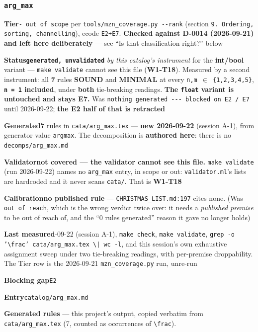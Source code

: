 \documentclass[10pt,a4paper]{article}
\newcommand{\entryfield}[2]{{\raggedright\textbf{#1}\quad #2\par}}
\begin{document}
\subsubsection*{\texttt{arg\_\allowbreak{}max}}
\label{entry:arg-max}
\entryfield{Tier}{\texttt{- out of scope} per \texttt{tools/\allowbreak{}mzn\_\allowbreak{}coverage.\allowbreak{}py -\allowbreak{}-\allowbreak{}rank} (section \texttt{9.\allowbreak{} Ordering, sorting, channelling}), ecode \texttt{E2+E7}. \textbf{Checked against D-0014 (2026-09-21) and left here deliberately} --- see ``Is that classification right?'' below}
\entryfield{Status}{\textbf{\texttt{generated, unvalidated}} \emph{by this catalog's instrument} for the \textbf{int/bool} variant --- \texttt{make validate} cannot see this file (\textbf{W1-T18}). Measured by a second instrument: all \textbf{7} rules \textbf{SOUND} and \textbf{MINIMAL} at every \texttt{n,m $\in$ \{1,2,3,4,5\}}, \textbf{\texttt{n = 1} included}, under \textbf{both} tie-breaking readings. \textbf{The \texttt{float} variant is untouched and stays E7.} Was \texttt{nothing generated -\allowbreak{}-\allowbreak{}-\allowbreak{} blocked on E2 /\allowbreak{} E7} until 2026-09-22; \textbf{the E2 half of that is retracted}}
\entryfield{Generated}{\textbf{7} rules in \texttt{cata/arg\_max.tex} --- \textbf{new 2026-09-22} (session A-1), from generator value \texttt{argmax}. The decomposition is \textbf{authored here}: there is no \texttt{decomps/arg\_max.md}}
\entryfield{Validator}{\textbf{not covered --- the validator cannot see this file.} \texttt{make validate} (run 2026-09-22) names no \texttt{arg\_max} entry, in scope or out: \texttt{validator.ml}'s lists are hardcoded and it never scans \texttt{cata/}. That is \textbf{W1-T18}}
\entryfield{Calibration}{\textbf{no published rule} --- \texttt{CHRISTMAS\_LIST.md:197} cites none. (Was \texttt{out of reach}, which is the wrong verdict twice over: it needs a \emph{published premise} to be out of reach of, and the ``0 rules generated'' reason it gave no longer holds)}
\entryfield{Last measured}{2026-09-22 (session A-1), \texttt{make check}, \texttt{make validate}, \texttt{grep -\allowbreak{}o '\textbackslash{}frac' cata/\allowbreak{}arg\_\allowbreak{}max.\allowbreak{}tex \textbackslash{}| wc -\allowbreak{}l}, and this session's own exhaustive assignment sweep under two tie-breaking readings, with per-premise droppability. The Tier row is the 2026-09-21 \texttt{mzn\_coverage.py} run, unre-run}
\entryfield{Blocking gap}{\texttt{E2}}
\entryfield{Entry}{\texttt{catalog/arg\_max.md}}

\textbf{Generated rules} --- this project's output, copied verbatim from \texttt{cata/arg\_max.tex} (7, counted as occurrences of \texttt{\textbackslash{}frac}).\par
\end{document}
